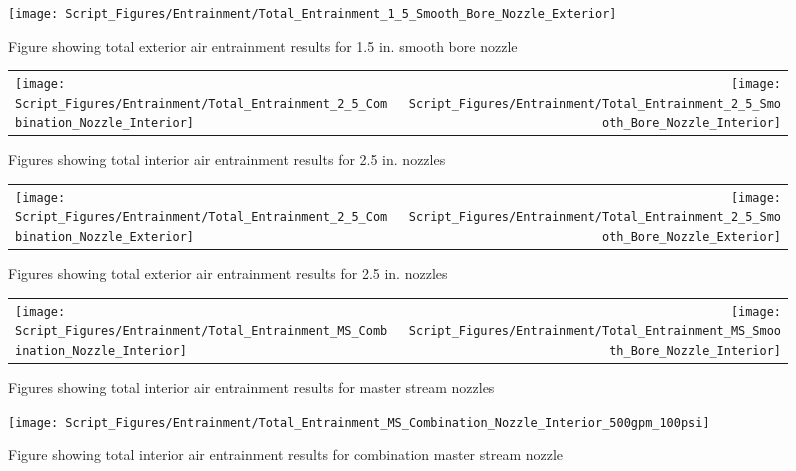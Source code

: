 \documentclass{article}
\begin{document}
\begin{figure}[!ht]
\centering
\texttt{[image: Script\_Figures/Entrainment/Total\_Entrainment\_1\_5\_Smooth\_Bore\_Nozzle\_Exterior]}
\caption{Figure showing total exterior air entrainment results for 1.5 in. smooth bore nozzle}
\label{fig:1_5_Exterior_Total_Entrainment}
\end{figure}

\clearpage

\begin{figure}[!ht]
\begin{tabular*}{\textwidth}{lr}
\texttt{[image: Script\_Figures/Entrainment/Total\_Entrainment\_2\_5\_Combination\_Nozzle\_Interior]} &
\texttt{[image: Script\_Figures/Entrainment/Total\_Entrainment\_2\_5\_Smooth\_Bore\_Nozzle\_Interior]} \\
\end{tabular*}
\caption{Figures showing total interior air entrainment results for 2.5 in. nozzles}
\label{fig:2_5_Interior_Total_Entrainment}
\end{figure}

\begin{figure}[!ht]
\begin{tabular*}{\textwidth}{lr}
\texttt{[image: Script\_Figures/Entrainment/Total\_Entrainment\_2\_5\_Combination\_Nozzle\_Exterior]} &
\texttt{[image: Script\_Figures/Entrainment/Total\_Entrainment\_2\_5\_Smooth\_Bore\_Nozzle\_Exterior]} \\
\end{tabular*}
\caption{Figures showing total exterior air entrainment results for 2.5 in. nozzles}
\label{fig:2_5_Exterior_Total_Entrainment}
\end{figure}

\clearpage

\begin{figure}[!ht]
\begin{tabular*}{\textwidth}{lr}
\texttt{[image: Script\_Figures/Entrainment/Total\_Entrainment\_MS\_Combination\_Nozzle\_Interior]} &
\texttt{[image: Script\_Figures/Entrainment/Total\_Entrainment\_MS\_Smooth\_Bore\_Nozzle\_Interior]} \\
\end{tabular*}
\caption{Figures showing total interior air entrainment results for master stream nozzles}
\label{fig:MS_Interior_Total_Entrainment}
\end{figure}

\begin{figure}[!ht]
\centering
\texttt{[image: Script\_Figures/Entrainment/Total\_Entrainment\_MS\_Combination\_Nozzle\_Interior\_500gpm\_100psi]}
\caption{Figure showing total interior air entrainment results for combination master stream nozzle}
\label{fig:MS_Interior_Total_Entrainment_Combination}
\end{figure}
\end{document}
